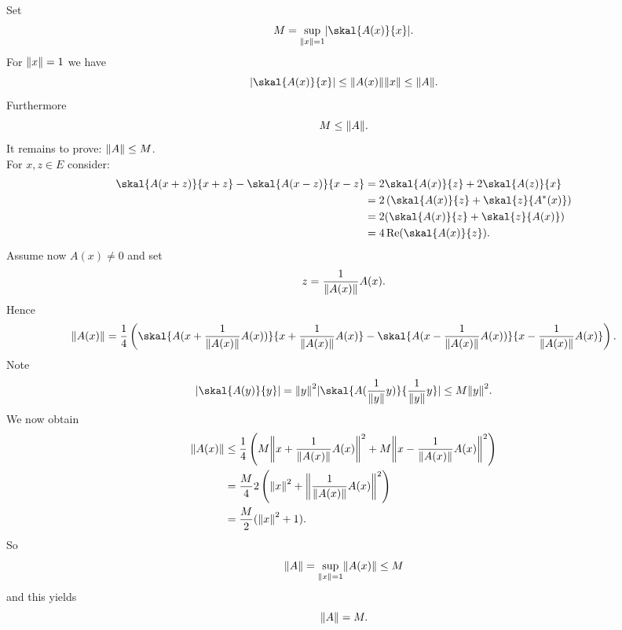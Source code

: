 \begin{beweis}
	Set 
	\[
		M = \sup_{\norm{x}=1} \abs{\skal{A(x)}{x}}.
	\]
	For $\norm{x}=1$ we have
	\[
		\abs{\skal{A(x)}{x}} \leq \norm{A(x)} \norm{x} \leq \norm{A}.
	\]
	Furthermore
	\[
		M \leq \norm{A}.
	\]
	It remains to prove: $\norm{A} \leq M$. \\
	For $x,z \in E$ consider:
	\begin{align*}
		\skal{A(x+z)}{x+z} - \skal{A(x-z)}{x-z} &= 2 \skal{A(x)}{z} + 2 \skal{A(z)}{x} \\
		&= 2 \left( \skal{A(x)}{z} + \skal{z}{A^*(x)} \right) \\
		&= 2 (\skal{A(x)}{z} + \skal{z}{A(x)}) \\
		&= 4 \re( \skal{A(x)}{z}).
	\end{align*}
	Assume now $A(x) \neq 0$ and set
	\[
		z = \frac{1}{\norm{A(x)}} A(x).
	\]
	Hence
	\[
		\norm{A(x)} = \frac{1}{4} \left( \skal{A(x+\frac{1}{\norm{A(x)}} A(x))}{x + \frac{1}{\norm{A(x)}} A(x)} 
		- \skal{A(x-\frac{1}{\norm{A(x)}} A(x))}{x- \frac{1}{\norm{A(x)}} A(x)} \right).
	\]
	Note \[
		\abs{\skal{A(y)}{y}} = \norm{y}^2 \abs{\skal{A(\frac{1}{\norm{y}}y)}{ \frac{1}{\norm{y}}y}} \leq M \norm{y}^2.
	\]
	We now obtain
	\begin{align*}
		\norm{A(x)} &\leq \frac{1}{4} \left( M \norm{x+\frac{1}{\norm{A(x)}} A(x)}^2 + M \norm{x - \frac{1}{\norm{A(x)}} A(x)}^2 \right) \\
		&= \frac{M}{4} 2 \left( \norm{x}^2 + \norm{\frac{1}{\norm{A(x)}} A(x)}^2 \right) \\
		&= \frac{M}{2} (\norm{x}^2 +1).
	\end{align*}
	So
	\[
		\norm{A} = \sup_{\norm{x}=1} \norm{A(x)} \leq M
	\]
	and this yields
	\[
		\norm{A}= M.
	\]
\end{beweis}
